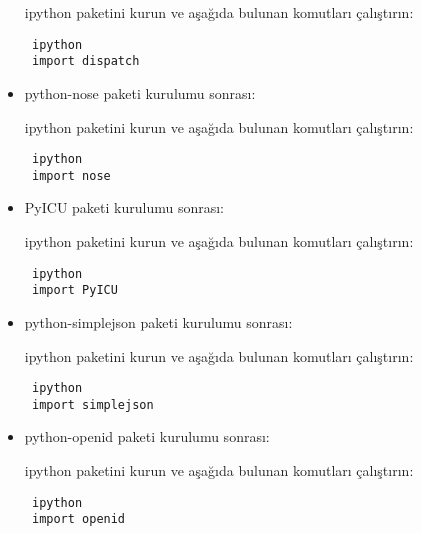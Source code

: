 \documentclass[a4paper,10pt]{article}
\begin{document}
\begin{itemize}
ipython paketini kurun ve aşağıda bulunan komutları çalıştırın:
\begin{verbatim}
 ipython
 import dispatch
\end{verbatim}

\item python-nose paketi kurulumu sonrası:  

ipython paketini kurun ve aşağıda bulunan komutları çalıştırın:
\begin{verbatim}
 ipython
 import nose
\end{verbatim}

\item PyICU paketi kurulumu sonrası:  

ipython paketini kurun ve aşağıda bulunan komutları çalıştırın:
\begin{verbatim}
 ipython
 import PyICU
\end{verbatim}

\item python-simplejson paketi kurulumu sonrası:  

ipython paketini kurun ve aşağıda bulunan komutları çalıştırın:
\begin{verbatim}
 ipython
 import simplejson
\end{verbatim}
\item python-openid paketi kurulumu sonrası:  

ipython paketini kurun ve aşağıda bulunan komutları çalıştırın:
\begin{verbatim}
 ipython
 import openid
\end{verbatim}

\end{itemize}
\end{document}
